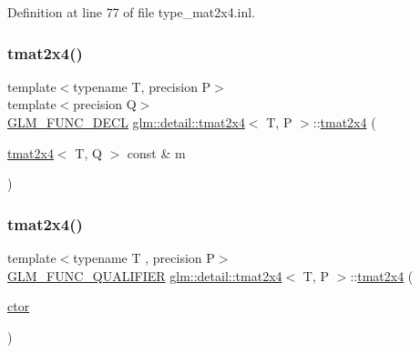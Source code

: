 Definition at line 77 of file type\+\_\+mat2x4.\+inl.

\mbox{\label{structglm_1_1detail_1_1tmat2x4_a6abbbe035dd18771e08fc4e8e25aa043}} 
\subsubsection{\texorpdfstring{tmat2x4()}{tmat2x4()}\hspace{0.1cm}{\footnotesize\ttfamily [3/22]}}
{\footnotesize\ttfamily template$<$typename T, precision P$>$ \\
template$<$precision Q$>$ \\
\hyperlink{setup_8hpp_ab2d052de21a70539923e9bcbf6e83a51}{G\+L\+M\+\_\+\+F\+U\+N\+C\+\_\+\+D\+E\+CL} \hyperlink{structglm_1_1detail_1_1tmat2x4}{glm\+::detail\+::tmat2x4}$<$ T, P $>$\+::\hyperlink{structglm_1_1detail_1_1tmat2x4}{tmat2x4} (\begin{DoxyParamCaption}\item[{\hyperlink{structglm_1_1detail_1_1tmat2x4}{tmat2x4}$<$ T, Q $>$ const \&}]{m }\end{DoxyParamCaption})}

\mbox{\label{structglm_1_1detail_1_1tmat2x4_ad3a92b19fec6109e97262c6e43699ee9}} 
\subsubsection{\texorpdfstring{tmat2x4()}{tmat2x4()}\hspace{0.1cm}{\footnotesize\ttfamily [4/22]}}
{\footnotesize\ttfamily template$<$typename T , precision P$>$ \\
\hyperlink{setup_8hpp_a33fdea6f91c5f834105f7415e2a64407}{G\+L\+M\+\_\+\+F\+U\+N\+C\+\_\+\+Q\+U\+A\+L\+I\+F\+I\+ER} \hyperlink{structglm_1_1detail_1_1tmat2x4}{glm\+::detail\+::tmat2x4}$<$ T, P $>$\+::\hyperlink{structglm_1_1detail_1_1tmat2x4}{tmat2x4} (\begin{DoxyParamCaption}\item[{\hyperlink{structglm_1_1detail_1_1tmat2x4_a3876cfcf80892580917b2b0417c22c24}{ctor}}]{ }\end{DoxyParamCaption})\hspace{0.3cm}{\ttfamily [explicit]}}



